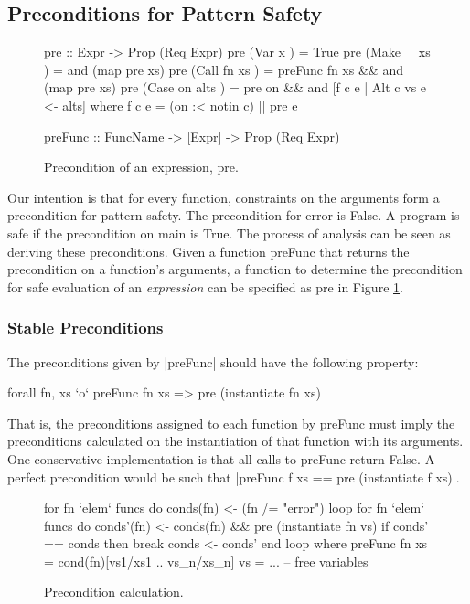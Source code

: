 \documentclass[preprint]{sigplanconf}
\newcommand{\C}[1]{\textsf{#1}}
\newenvironment{discuss}
    {\noindent\hspace{-1.5mm}\vline\hspace{1mm}\vline\hspace{1mm}\begin{minipage}[h]{\linewidth}}
    {\end{minipage}}
\begin{document}
\subsection{Preconditions for Pattern Safety}
\label{sec:precond}

\begin{figure}
\begin{code}
pre :: Expr -> Prop (Req Expr)
pre (Var   x         ) = True
pre (Make  _   xs    ) = and (map pre xs)
pre (Call  fn  xs    ) = preFunc fn xs && and (map pre xs)
pre (Case  on  alts  ) = pre on && and [f c e | Alt c vs e <- alts]
    where f c e = (on :< notin c) || pre e

preFunc :: FuncName -> [Expr] -> Prop (Req Expr)
\end{code}
\caption{Precondition of an expression, \C{pre}.}
\label{fig:precondition}
\end{figure}

Our intention is that for every function, constraints on the arguments form a precondition for pattern safety. The precondition for \C{error} is False. A program is safe if the precondition on \C{main} is True. The process of analysis can be seen as deriving these preconditions. Given a function \C{preFunc} that returns the precondition on a function's arguments, a function to determine the precondition for safe evaluation of an \textit{expression} can be specified as \C{pre} in Figure \ref{fig:precondition}.

\subsubsection{Stable Preconditions}

\begin{discuss}
The preconditions given by |preFunc| should have the following property:

\begin{code}
forall fn, xs `o` preFunc fn xs => pre (instantiate fn xs)
\end{code}

That is, the preconditions assigned to each function by \C{preFunc} must imply the preconditions calculated on the instantiation of that function with its arguments. One conservative implementation is that all calls to \C{preFunc} return False. A perfect precondition would be such that |preFunc f xs == pre (instantiate f xs)|.
\end{discuss}

\begin{figure}
\begin{code}
for fn `elem` funcs do conds(fn) <- (fn /= "error")
loop
    for fn `elem` funcs do
        conds'(fn) <- conds(fn) && pre (instantiate fn vs)
    if conds' == conds then break
    conds <- conds'
end loop
    where
        preFunc fn xs = cond(fn)[vs1/xs1 .. vs_n/xs_n]
        vs = ... -- free variables
\end{code}
\caption{Precondition calculation.}
\label{fig:precond_fixp}
\end{figure}
\end{document}
